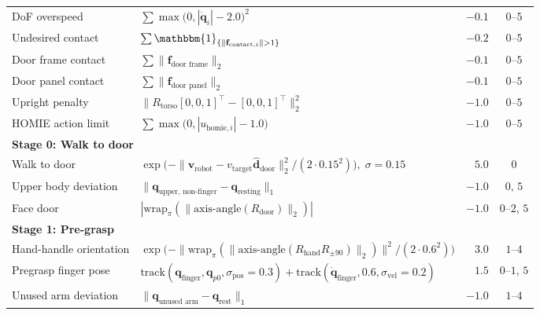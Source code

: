 \begin{table}[t]
\begin{tabular}{l l r c}
DoF overspeed
  & $\sum\max\bigl(0, |\dot{\mathbf{q}}_i|-2.0\bigr)^{2}$
  & $-0.1$ & $0$--$5$ \\

Undesired contact
  & $\sum\mathbbm{1}_{\{\|\mathbf{f}_{\text{contact},i}\|>1\}}$
  & $-0.2$ & $0$--$5$ \\

Door frame contact
  & $\sum\|\mathbf{f}_{\text{door frame}}\|_2$
  & $-0.1$ & $0$--$5$ \\

Door panel contact
  & $\sum\|\mathbf{f}_{\text{door panel}}\|_2$
  & $-0.1$ & $0$--$5$ \\

Upright penalty
  & $\bigl\|R_{\text{torso}}[0,0,1]^{\top} - [0,0,1]^{\top}\bigr\|_2^{2}$
  & $-1.0$ & $0$--$5$ \\

HOMIE action limit
  & $\sum\max\bigl(0, |u_{\text{homie},i}|-1.0\bigr)$
  & $-1.0$ & $0$--$5$ \\

\midrule
\multicolumn{4}{l}{\textbf{Stage 0: Walk to door}} \\

Walk to door
  & $\exp\bigl(-\|\mathbf{v}_{\text{robot}}-v_{\text{target}}\hat{\mathbf{d}}_{\text{door}}\|_2^{2}/(2\cdot 0.15^{2})\bigr),\; \sigma=0.15$
  & $5.0$ & $0$ \\

Upper body deviation
  & $\|\mathbf{q}_{\text{upper, non-finger}}-\mathbf{q}_{\text{resting}}\|_1$
  & $-1.0$ & $0$, $5$ \\

Face door
  & $|\text{wrap}_{\pi}(\|\text{axis-angle}(R_{\text{door}})\|_2)|$
  & $-1.0$ & $0$--$2$, $5$ \\

\midrule
\multicolumn{4}{l}{\textbf{Stage 1: Pre-grasp}} \\

Hand-handle orientation
  & $\exp\bigl(-\|\text{wrap}_{\pi}(\|\text{axis-angle}(R_{\text{hand}}R_{\pm 90})\|_2)\|^{2}/(2\cdot 0.6^{2})\bigr)$
  & $3.0$ & $1$--$4$ \\

Pregrasp finger pose
  & $\text{track}(\mathbf{q}_{\text{finger}}, \mathbf{q}_{p0}, \sigma_{\text{pos}}=0.3) + \text{track}(\dot{\mathbf{q}}_{\text{finger}}, 0.6, \sigma_{\text{vel}}=0.2)$
  & $1.5$ & $0$--$1$, $5$ \\

Unused arm deviation
  & $\|\mathbf{q}_{\text{unused arm}}-\mathbf{q}_{\text{rest}}\|_1$
  & $-1.0$ & $1$--$4$ \\


\end{tabular}
\end{table}
